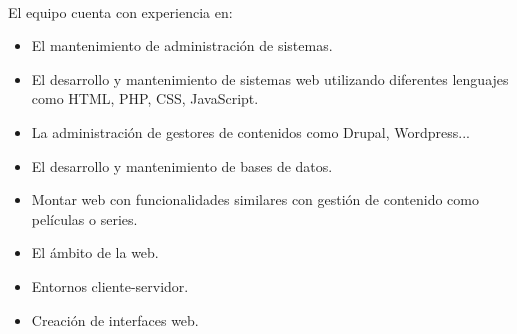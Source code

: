 
\paragraph{} El equipo cuenta con experiencia en:
\begin{itemize}

\item El mantenimiento de administración de sistemas.
\item El desarrollo y mantenimiento de sistemas web utilizando diferentes lenguajes como HTML, PHP, CSS, JavaScript.
\item La administración de gestores de contenidos como Drupal, Wordpress... 
\item El desarrollo y mantenimiento de bases de datos.
\item Montar web con funcionalidades similares con gestión de contenido como películas o series.
\item El ámbito de la web.
\item Entornos cliente-servidor.
\item Creación de interfaces web.

\end{itemize}